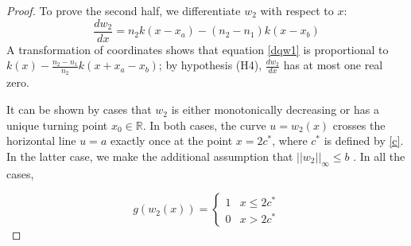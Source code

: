 \documentclass[11pt]{article}
\theoremstyle{definition}
\numberwithin{equation}{section}
\numberwithin{thm}{section}
\renewcommand{\a}{a}
\renewcommand{\b}{b}
\newcommand{\m}{n_1}
\newcommand{\mtwo}{n_2}
\begin{document}
\begin{proof}
To prove the second half, we differentiate $w_2$ with respect to $x$:
\begin{equation} \label{dqw1}
\frac{dw_2}{dx} = \mtwo k(x-x_\a) - (\mtwo-\m) k(x-x_\b)
\end{equation}
A transformation of coordinates shows that equation \eqref{dqw1} is proportional to $k(x) - \frac{\mtwo-\m}{\mtwo} k(x+x_\a-x_\b)$; by hypothesis (H4), $\frac{dw_2}{dx}$ has at most one real zero.

It can be shown by cases that $w_2$ is either monotonically decreasing or has a unique turning point $x_0 \in \mathbb R$. In both cases, the curve $u=w_2(x)$ crosses the horizontal line $u=\a$ exactly once at the point $x=2c^*$, where $c^*$ is defined by \eqref{c}. In the latter case, we make the additional assumption that $|| w_2 ||_\infty \leq \b$ .
In all the cases, 


\begin{equation}
g(w_2(x)) = \begin{cases}
1 & x \leq 2c^* \\
0 & x > 2c^*
\end{cases}
\end{equation}


%


\end{proof}
\end{document}
